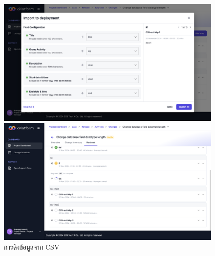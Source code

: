\begin{figure}[H]
    \begin{center}
        \includegraphics[width=\linewidth]{resources/pages/change-runbook/import-csv/37.png}
    
        \vspace{1in}
    
        \includegraphics[width=\linewidth]{resources/pages/change-runbook/import-csv/38.png}
    \end{center}
    \caption[การดึงข้อมูลจาก CSV]{การดึงข้อมูลจาก CSV}
  \label{fig:import-csv}
\end{figure}

\newpage
